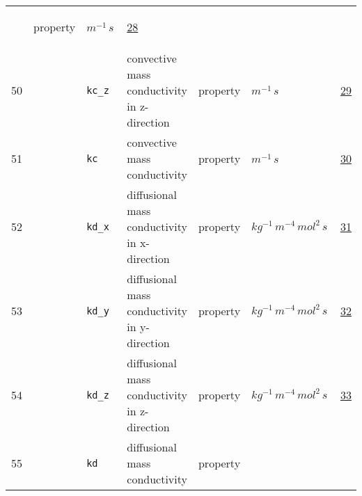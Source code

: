 \begin{longtable}{|p{1cm}|p{2.5cm}|p{4.5cm}|p{8cm}|p{3.0cm}|p{3cm}|p{1cm}|}
             & \begin{lay}property \end{lay}
             & $ m^{-1} \,s \, $
             &                 \hyperlink{"e:28"}{ 28 }
                 \\
        50
             & \hypertarget{"v:50"}{ $ {} $}
             & \verb|kc_z|
             & convective mass conductivity in z-direction
             & \begin{lay}property \end{lay}
             & $ m^{-1} \,s \, $
             &                 \hyperlink{"e:29"}{ 29 }
                 \\
        51
             & \hypertarget{"v:51"}{ $ {} $}
             & \verb|kc|
             & convective mass conductivity
             & \begin{lay}property \end{lay}
             & $ m^{-1} \,s \, $
             &                 \hyperlink{"e:30"}{ 30 }
                 \\
        52
             & \hypertarget{"v:52"}{ $ {} $}
             & \verb|kd_x|
             & diffusional mass conductivity in x-direction
             & \begin{lay}property \end{lay}
             & $ kg^{-1} \,m^{-4} \,mol^{2} \,s \, $
             &                 \hyperlink{"e:31"}{ 31 }
                 \\
        53
             & \hypertarget{"v:53"}{ $ {} $}
             & \verb|kd_y|
             & diffusional mass conductivity in y-direction
             & \begin{lay}property \end{lay}
             & $ kg^{-1} \,m^{-4} \,mol^{2} \,s \, $
             &                 \hyperlink{"e:32"}{ 32 }
                 \\
        54
             & \hypertarget{"v:54"}{ $ {} $}
             & \verb|kd_z|
             & diffusional mass conductivity in z-direction
             & \begin{lay}property \end{lay}
             & $ kg^{-1} \,m^{-4} \,mol^{2} \,s \, $
             &                 \hyperlink{"e:33"}{ 33 }
                 \\
        55
             & \hypertarget{"v:55"}{ $ {} $}
             & \verb|kd|
             & diffusional mass conductivity
             & \begin{lay}property \end{lay}

\end{longtable}
